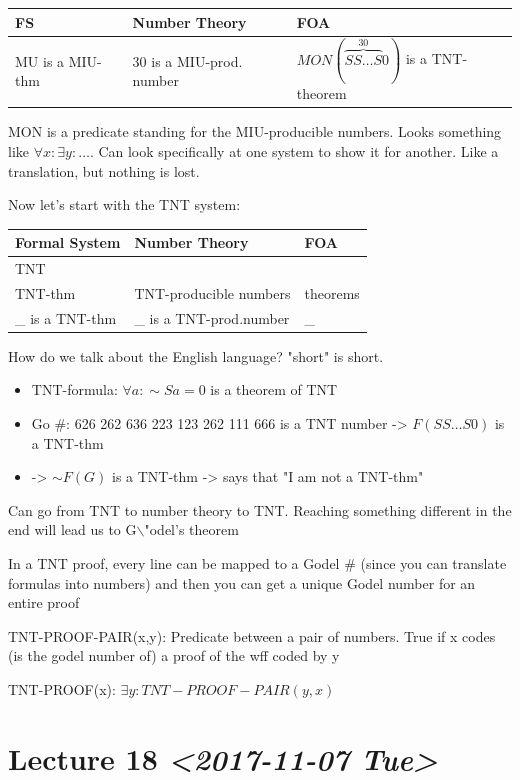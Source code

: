 \documentclass[11pt]{article}
\begin{document}
\begin{center}
\begin{tabular}{lll}
FS & Number Theory & FOA\\
\hline
MU is a MIU-thm & \(30\) is a MIU-prod. number & \(MON(\overbrace{SS \ldots S}^{30}0)\) is a TNT-theorem\\
\end{tabular}
\end{center}
MON is a predicate standing for the MIU-producible numbers. Looks something like \(\forall x : \exists y : \ldots\).
Can look specifically at one system to show it for another. Like a translation, but nothing is lost.

Now let's start with the TNT system:
\begin{center}
\begin{tabular}{lll}
Formal System & Number Theory & FOA\\
\hline
TNT &  & \\
TNT-thm & TNT-producible numbers & theorems\\
\_ is a TNT-thm & \_ is a TNT-prod.number & \_\\
\end{tabular}
\end{center}

How do we talk about the English language? "short" is short.

\begin{itemize}
\item TNT-formula: \(\forall a : \sim Sa = 0\) is a theorem of TNT
\item Go \#: 626 262 636 223 123 262 111 666 is a TNT number -> \(F(SS\ldots S0)\) is a TNT-thm
\item -> \(\sim F(G)\) is a TNT-thm -> says that "I am not a TNT-thm"
\end{itemize}
Can go from TNT to number theory to TNT. Reaching something different in the end will lead us to G$\backslash$"odel's theorem

In a TNT proof, every line can be mapped to a Godel \# (since you can translate formulas into numbers) and then you can get a unique Godel number for an entire proof

TNT-PROOF-PAIR(x,y): Predicate between a pair of numbers. True if x codes (is the godel number of) a proof of the wff coded by y

TNT-PROOF(x): \(\exists y:TNT-PROOF-PAIR(y,x)\)
\section{Lecture 18 \textit{<2017-11-07 Tue>}}
\label{sec:orge562197}
\end{document}

